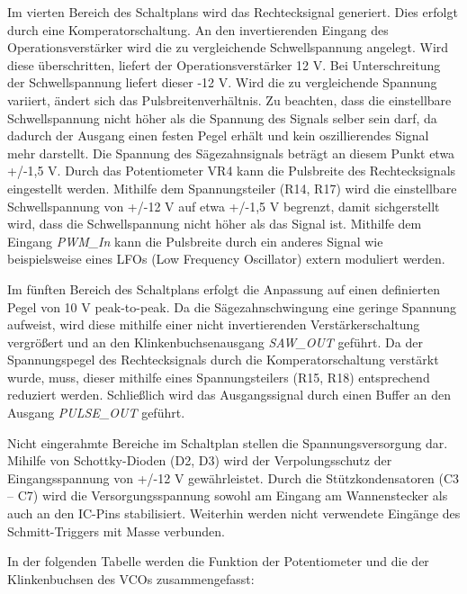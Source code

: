 Im vierten Bereich des Schaltplans wird das Rechtecksignal generiert. 
Dies erfolgt durch eine Komperatorschaltung.
An den invertierenden Eingang des Operationsverstärker wird die zu vergleichende Schwellspannung angelegt. 
Wird diese überschritten, liefert der Operationsverstärker 12 V. 
Bei Unterschreitung der Schwellspannung liefert dieser -12 V.
Wird die zu vergleichende Spannung variiert, ändert sich das Pulsbreitenverhältnis.
Zu beachten, dass die einstellbare Schwellspannung nicht höher als die Spannung des Signals selber sein darf, da dadurch der Ausgang einen festen Pegel erhält und kein oszillierendes Signal mehr darstellt.
Die Spannung des Sägezahnsignals beträgt an diesem Punkt etwa +/-1,5 V.
Durch das Potentiometer VR4 kann die Pulsbreite des Rechtecksignals eingestellt werden.
Mithilfe dem Spannungsteiler (R14, R17) wird die einstellbare Schwellspannung von +/-12 V auf etwa +/-1,5 V begrenzt, damit sichgerstellt wird, dass die Schwellspannung nicht höher als das Signal ist.
Mithilfe dem Eingang \textit{PWM\_In} kann die Pulsbreite durch ein anderes Signal wie beispielsweise eines LFOs (Low Frequency Oscillator) extern moduliert werden.

Im fünften Bereich des Schaltplans erfolgt die Anpassung auf einen definierten Pegel von 10 V peak-to-peak. 
Da die Sägezahnschwingung eine geringe Spannung aufweist, wird diese mithilfe einer nicht invertierenden Verstärkerschaltung vergrößert und an den Klinkenbuchsenausgang \textit{SAW\_OUT} geführt. 
Da der Spannungspegel des Rechtecksignals durch die Komperatorschaltung verstärkt wurde, muss, dieser mithilfe eines Spannungsteilers (R15, R18) entsprechend reduziert werden. 
Schließlich wird das Ausgangssignal durch einen Buffer an den Ausgang \textit{PULSE\_OUT} geführt.

Nicht eingerahmte Bereiche im Schaltplan stellen die Spannungsversorgung dar. 
Mihilfe von Schottky-Dioden (D2, D3) wird der Verpolungsschutz der Eingangsspannung von +/-12 V gewährleistet. 
Durch die Stützkondensatoren (C3 -- C7) wird die Versorgungsspannung sowohl am Eingang am Wannenstecker als auch an den IC-Pins stabilisiert.
Weiterhin werden nicht verwendete Eingänge des Schmitt-Triggers mit Masse verbunden.


In der folgenden Tabelle werden die Funktion der Potentiometer und die der Klinkenbuchsen des VCOs zusammengefasst:


